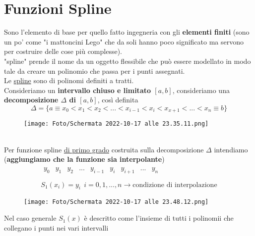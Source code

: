 \documentclass[a4paper, portrait]{book}
\numberwithin{equation}{chapter} %
\begin{document}
\section*{Funzioni Spline}
Sono l'elemento di base per quello fatto ingegneria con gli \textbf{elementi finiti} (sono un po' come "i mattoncini Lego" che da soli hanno poco significato ma servono per costruire delle cose più complesse).\\
"spline" prende il nome da un oggetto flessibile che può essere modellato in modo tale da creare un polinomio che passa per i punti assegnati.\\
Le \underline{spline} sono di polinomi definiti a tratti.\\
Consideriamo un \textbf{intervallo chiuso e limitato $[a,b]$}, consideriamo una \textbf{decomposizione $\Delta$ di $[a,b]$}, così definita
\begin{equation}
    \Delta = \{a \equiv x_0 < x_1 < x_2 < ... < x_{i-1}< x_i < x_{x+1}< ... < x_n \equiv b\}
\end{equation}
\begin{figure}[h!]
    \centering
    \texttt{[image: Foto/Schermata 2022-10-17 alle 23.35.11.png]}
    \caption{}
\end{figure}
\\Per funzione spline \underline{di primo grado} costruita sulla decomposizione $\Delta$ intendiamo (\textbf{aggiungiamo che la funzione sia interpolante})
\begin{gather}
    \begin{matrix}
        y_0&y_1&y_2&...&y_{i-1}&y_i&y_{i+1}&...&y_n\\
    \end{matrix}\\
    S_1(x_i) = y_i \ \ i = 0,1,...,n \rightarrow \text{condizione di interpolazione}
\end{gather}
\begin{figure}[h!]
    \centering
    \texttt{[image: Foto/Schermata 2022-10-17 alle 23.48.12.png]}
    \caption{}
\end{figure}
Nel caso generale $S_1(x)$ è descritto come l'insieme di tutti i polinomii che collegano i punti nei vari intervalli
\end{document}

